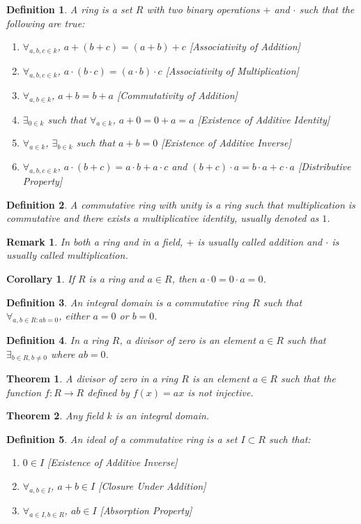 \documentclass{article}
\theoremstyle{mystyle}
\newtheorem{theorem}{Theorem}[section]
\newtheorem{definition}{Definition}[section]
\newtheorem{corollary}{Corollary}[section]
\newtheorem{remark}{Remark}[section]
\begin{document}
\begin{definition}
A ring is a set $R$ with two binary operations $+$ and $\cdot$ such that the following are true:
\begin{enumerate}
    \item $\forall_{a,b,c\in k}$, $a+(b+c)=(a+b)+c$ \hfill [Associativity of Addition]
    \item $\forall_{a,b,c\in k}$, $a\cdot(b\cdot c) = (a\cdot b)\cdot c$ \hfill [Associativity of Multiplication]
    \item $\forall_{a,b\in k}$, $a+b=b+a$ \hfill [Commutativity of Addition]
    \item $\exists_{0 \in k}$ such that $\forall_{a\in k}$, $a+0=0+a = a$ \hfill [Existence of Additive Identity]
    \item $\forall_{a\in k}$, $\exists_{b\in k}$ such that $a+b=0$ \hfill [Existence of Additive Inverse]
    \item $\forall_{a,b,c\in k}$, $a\cdot(b+c) = a\cdot b + a\cdot c$ and $(b+c)\cdot a = b\cdot a + c\cdot a$ \hfill [Distributive Property]
\end{enumerate}
\end{definition}
\begin{definition}
A commutative ring with unity is a ring such that multiplication is commutative and there exists a multiplicative identity, usually denoted as $1$.
\end{definition}
\begin{remark}
In both a ring and in a field, $+$ is usually called addition and $\cdot$ is usually called multiplication.
\end{remark}
\begin{corollary}
If $R$ is a ring and $a\in R$, then $a\cdot 0 = 0\cdot a = 0$.
\end{corollary}
\begin{definition}
An integral domain is a commutative ring $R$ such that $\forall_{a,b\in R:ab=0}$, either $a=0$ or $b=0$.
\end{definition}
\begin{definition}
In a ring $R$, a divisor of zero is an element $a\in R$ such that $\exists_{b\in R,b\ne 0}$ where $ab=0$.
\end{definition}
\begin{theorem}
A divisor of zero in a ring $R$ is an element $a\in R$ such that the function $f:R\rightarrow R$ defined by $f(x) = ax$ is not injective.
\end{theorem}
\begin{theorem}
Any field $k$ is an integral domain.
\end{theorem}
\begin{definition}
An ideal of a commutative ring is a set $I\subset R$ such that:
\begin{enumerate}
    \item $0\in I$ \hfill [Existence of Additive Inverse]
    \item $\forall_{a,b\in I}$, $a+b\in I$ \hfill [Closure Under Addition]
    \item $\forall_{a\in I,b\in R}$, $a b \in I$ \hfill [Absorption Property]
\end{enumerate}
\end{definition}
\end{document}
